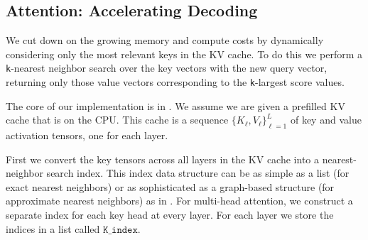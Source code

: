 
\subsection{\Topk Attention: Accelerating Decoding}\label{sec:topk-attention}

We cut down on the growing memory and compute costs by dynamically considering only the most relevant keys in the KV cache. To do this we perform a \texttt{k}-nearest neighbor search over the key vectors with the new query vector, returning only those value vectors corresponding to the \texttt{k}-largest score values.


The core of our implementation is in . We assume we are given a prefilled KV cache that is on the CPU. This cache is a sequence $\{K_{\ell}, V_{\ell}\}_{\ell=1}^{L}$ of key and value activation tensors, one for each layer. 

First we convert the key tensors across all layers in the KV cache into a nearest-neighbor search index. This index data structure can be as simple as a list (for exact nearest neighbors) or as sophisticated as a graph-based structure (for approximate nearest neighbors) as in \cite{10.1109/TPAMI.2018.2889473}. For multi-head attention, we construct a separate index for each key head at every layer. For each layer we store the indices in a list called $\texttt{K\_index}$.

